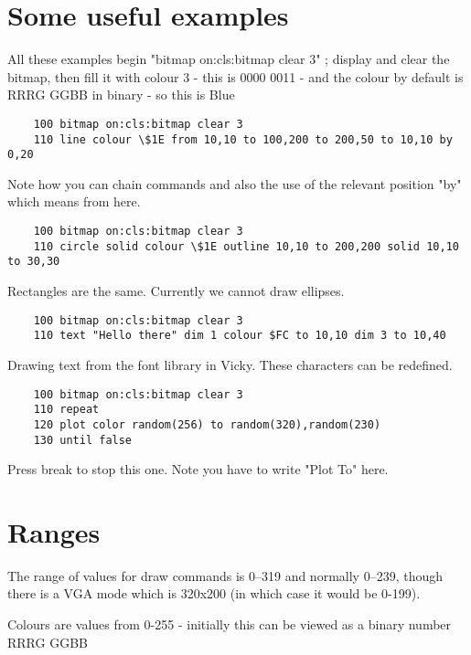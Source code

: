 \section{Some useful examples}

All these examples begin "bitmap on:cls:bitmap clear 3" ; display and clear the bitmap, then fill it with colour 3 - this is 0000 0011 - and the colour by default is RRRG GGBB in binary - so this is Blue

\begin{verbatim}
	100 bitmap on:cls:bitmap clear 3
	110 line colour \$1E from 10,10 to 100,200 to 200,50 to 10,10 by 0,20	
\end{verbatim}

Note how you can chain commands  and also the use of the relevant position "by" which means from here.

\begin{verbatim}
	100 bitmap on:cls:bitmap clear 3
	110 circle solid colour \$1E outline 10,10 to 200,200 solid 10,10 to 30,30
\end{verbatim}


Rectangles are the same. Currently we cannot draw ellipses.

\begin{verbatim}
	100 bitmap on:cls:bitmap clear 3
	110 text "Hello there" dim 1 colour $FC to 10,10 dim 3 to 10,40	
\end{verbatim}

Drawing text from the font library in Vicky. These characters can be redefined.

\begin{verbatim}
	100 bitmap on:cls:bitmap clear 3
	110 repeat
	120 plot color random(256) to random(320),random(230)
	130 until false
\end{verbatim}

Press break to stop this one. Note you have to write "Plot To" here.

\section{Ranges}
The range of values for draw commands is 0–319 and normally 0–239, though there is a VGA mode which is 320x200 (in which case it would be 0-199).

Colours are values from 0-255 - initially this can be viewed as a binary number RRRG GGBB
